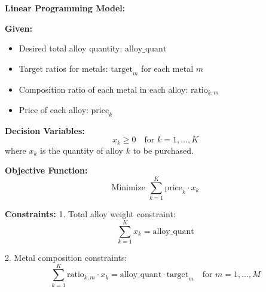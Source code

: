 \documentclass{article}
\begin{document}
\textbf{Linear Programming Model:}

\textbf{Given:}
\begin{itemize}
    \item Desired total alloy quantity: \( \text{alloy\_quant} \)
    \item Target ratios for metals: \( \text{target}_m \) for each metal \( m \)
    \item Composition ratio of each metal in each alloy: \( \text{ratio}_{k,m} \)
    \item Price of each alloy: \( \text{price}_k \)
\end{itemize}

\textbf{Decision Variables:}
\[
x_k \geq 0 \quad \text{for } k = 1, \ldots, K
\]
where \( x_k \) is the quantity of alloy \( k \) to be purchased.

\textbf{Objective Function:}
\[
\text{Minimize } \sum_{k=1}^{K} \text{price}_k \cdot x_k
\]

\textbf{Constraints:}
1. Total alloy weight constraint:
\[
\sum_{k=1}^{K} x_k = \text{alloy\_quant}
\]

2. Metal composition constraints:
\[
\sum_{k=1}^{K} \text{ratio}_{k,m} \cdot x_k = \text{alloy\_quant} \cdot \text{target}_m \quad \text{for } m = 1, \ldots, M
\]
\end{document}
